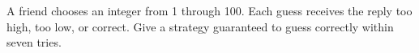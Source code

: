 A friend chooses an integer from 1 through 100. Each guess receives the reply too high, too low, or correct. Give a strategy guaranteed to guess correctly within seven tries.
